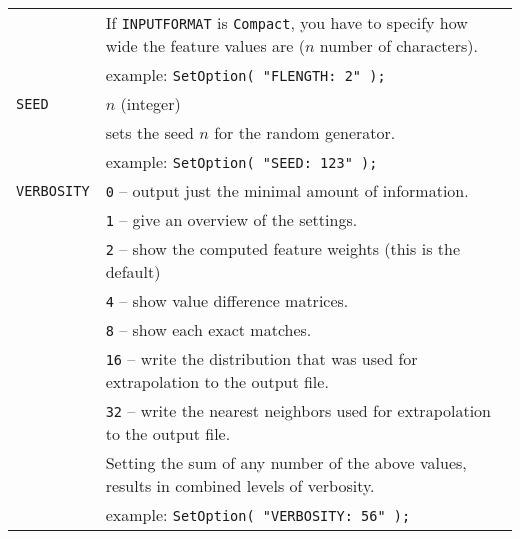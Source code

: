 \documentclass{report}
\begin{document}
\begin{tabular}{|l|p{12cm}|}
		  & If {\tt INPUTFORMAT} is {\tt Compact}, you have to specify how wide the feature values are ($n$ number of characters).\\
		  & example: {\tt SetOption( "FLENGTH: 2" );}\\
\hline
{\tt SEED}        & $n$ (integer)\\
		  & sets the seed $n$ for the random generator.\\
		  & example: {\tt SetOption( "SEED: 123" );}\\
\hline
{\tt VERBOSITY}	  & {\tt 0} -- output just the minimal amount of information.\\
		  & {\tt 1} -- give an overview of the settings.\\
		  & {\tt 2} -- show the computed feature weights (this is the
default)\\
		  & {\tt 4} -- show value difference matrices.\\
		  & {\tt 8} -- show each exact matches.\\
		  & {\tt 16} -- write the distribution that was used for extrapolation to the output file.\\
		  & {\tt 32} -- write the nearest neighbors used for extrapolation to the output file.\\
		  & Setting the sum of any number of the above
values, results in combined levels of verbosity.\\
		  & example: {\tt SetOption( "VERBOSITY: 56" );}\\
\hline
\end{tabular}
\end{document}
